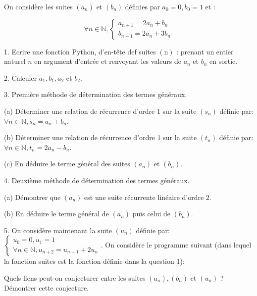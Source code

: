 \documentclass[a4paper, 11pt,reqno]{article}
\begin{document}
\begin{exercice}

On considère les suites $\left(a_{n}\right)$ et $\left(b_{n}\right)$ définies par $a_{0}=0, b_{0}=1$ et :

$$
\forall n \in \mathbb{N},\left\{\begin{array}{l}
a_{n+1}=2 a_{n}+b_{n} \\
b_{n+1}=2 a_{n}+3 b_{n}
\end{array}\right.
$$

1. Ecrire une fonction Python, d'en-tête def suites $(\mathrm{n})$ : prenant un entier naturel $n$ en argument d'entrée et renvoyant les valeurs de $a_{n}$ et $b_{n}$ en sortie.

2. Calculer $a_{1}, b_{1}, a_{2}$ et $b_{2}$.

3. Première méthode de détermination des termes généraux.

(a) Déterminer une relation de récurrence d'ordre 1 sur la suite $\left(s_{n}\right)$ définie par: $\forall n \in \mathbb{N}, s_{n}=a_{n}+b_{n}$.

(b) Déterminer une relation de récurrence d'ordre 1 sur la suite $\left(t_{n}\right)$ définie par: $\forall n \in \mathbb{N}, t_{n}=2 a_{n}-b_{n}$.

(c) En déduire le terme général des suites $\left(a_{n}\right)$ et $\left(b_{n}\right)$.

4. Deuxième méthode de détermination des termes généraux.

(a) Démontrer que $\left(a_{n}\right)$ est une suite récurrente linéaire d'ordre $2 .$

(b) En déduire le terme général de $\left(a_{n}\right)$ puis celui de $\left(b_{n}\right)$.

5. On considère maintenant la suite $\left(u_{n}\right)$ définie par: $\left\{\begin{array}{l}u_{0}=0, u_{1}=1 \\ \forall n \in \mathbb{N}, u_{n+2}=u_{n+1}+2 u_{n}\end{array} .\right.$ On considère le programme suivant (dans lequel la fonction suites est la fonction définie dans la question 1): 


Quels liens peut-on conjecturer entre les suites $\left(a_{n}\right),\left(b_{n}\right)$ et $\left(u_{n}\right)$ ? Démontrer cette conjecture.
\end{exercice}
\end{document}
